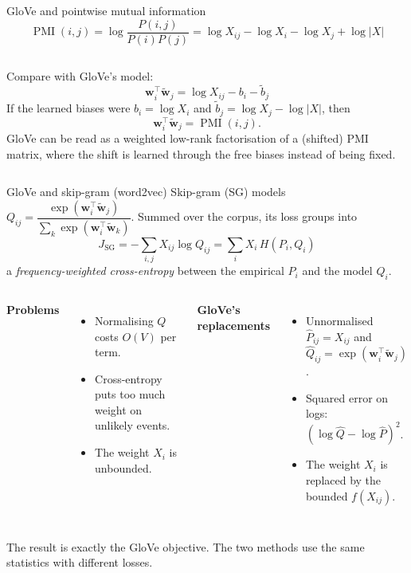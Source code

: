 \documentclass[aspectratio=169,11pt]{beamer}
\newcommand{\wv}{\mathbf{w}}
\newcommand{\cv}{\tilde{\mathbf{w}}}
\DeclareMathOperator{\PMI}{PMI}
\begin{document}
\begin{frame}{GloVe and pointwise mutual information}
\[
\PMI(i,j)=\log\frac{P(i,j)}{P(i)P(j)}=\log X_{ij}-\log X_i-\log X_j+\log|X|
\]
\begin{columns}[c]
\small
Compare with GloVe's model:
\[
\wv_i^\top\cv_j=\log X_{ij}-b_i-\tilde b_j
\]
If the learned biases were $b_i=\log X_i$ and $\tilde b_j=\log X_j-\log|X|$, then
\[
\wv_i^\top\cv_j=\PMI(i,j).
\]
GloVe can be read as a \alert{weighted low-rank factorisation of a (shifted) PMI matrix}, where the shift is learned through the free biases instead of being fixed.
\centering
{}
\end{columns}
\end{frame}

\begin{frame}{GloVe and skip-gram (word2vec)}
\small
Skip-gram (SG) models $Q_{ij}=\dfrac{\exp(\wv_i^\top\cv_j)}{\sum_k\exp(\wv_i^\top\cv_k)}$. Summed over the corpus, its loss groups into
\[
J_{\text{SG}}=-\sum_{i,j}X_{ij}\log Q_{ij}=\sum_i X_i\,H(P_i,Q_i)
\]
a \emph{frequency-weighted cross-entropy} between the empirical $P_i$ and the model $Q_i$.
\vspace{2mm}
\begin{columns}[T]
\textbf{Problems}
\begin{itemize}
  \item Normalising $Q$ costs $O(V)$ per term.
  \item Cross-entropy puts too much weight on unlikely events.
  \item The weight $X_i$ is unbounded.
\end{itemize}
\textbf{GloVe's replacements}
\begin{itemize}
  \item Unnormalised $\hat P_{ij}=X_{ij}$ and $\hat Q_{ij}=\exp(\wv_i^\top\cv_j)$.
  \item Squared error on \alert{logs}: $(\log\hat Q-\log\hat P)^2$.
  \item The weight $X_i$ is replaced by the bounded $f(X_{ij})$.
\end{itemize}
\end{columns}
\vspace{2mm}
\centering\small The result is exactly the GloVe objective. The two methods use the same statistics with different losses.
\end{frame}
\end{document}
